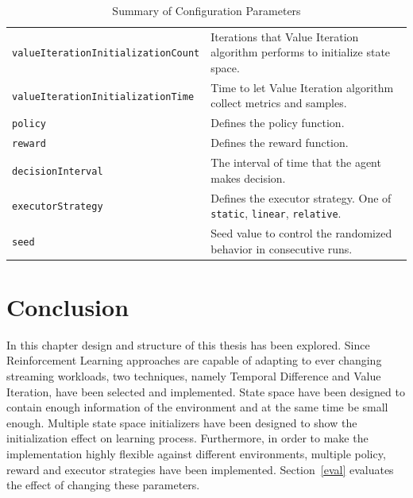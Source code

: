 \begin{table}[h]
\begin{tabularx}{\textwidth}{lX}
        \lstinline|valueIterationInitializationCount| & Iterations that Value Iteration algorithm performs to initialize state space.\\
        \lstinline|valueIterationInitializationTime| & Time to let Value Iteration algorithm collect metrics and samples. \\
        \lstinline|policy| & Defines the policy function.\\
        \lstinline|reward| & Defines the reward function.\\
        \lstinline|decisionInterval| & The interval of time that the agent makes decision. \\
        \lstinline|executorStrategy| & Defines the executor strategy. One of \lstinline|static|, \lstinline|linear|, \lstinline|relative|. \\
        \lstinline|seed| & Seed value to control the randomized behavior in consecutive runs.\\
        \bottomrule
    \end{tabularx}
    \centering
    \caption{Summary of Configuration Parameters}
    \label{des:tab:config}
\end{table}

\section{Conclusion}
\label{des:conc}
In this chapter design and structure of this thesis has been explored. Since Reinforcement Learning approaches are capable of adapting to ever changing streaming workloads, two techniques, namely Temporal Difference and Value Iteration, have been selected and implemented. State space have been designed to contain enough information of the environment and at the same time be small enough. Multiple state space initializers have been designed to show the initialization effect on learning process. Furthermore, in order to make the implementation highly flexible against different environments, multiple policy, reward and executor strategies have been implemented. Section~\ref{eval} evaluates the effect of changing these parameters. 